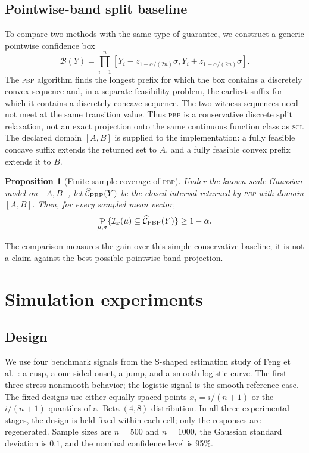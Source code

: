 \documentclass{interact}
\newtheorem{proposition}[theorem]{Proposition}
\theoremstyle{definition}
\theoremstyle{remark}
\newcommand{\I}{\mathcal{I}}
\newcommand{\Ph}{\mathop{\rm P}}
\newcommand{\SCI}{\textnormal{\textsc{sci}}\xspace}
\newcommand{\PBP}{\textnormal{\textsc{pbp}}\xspace}
\begin{document}
\subsection{Pointwise-band split baseline}

To compare two methods with the same type of guarantee, we construct a generic
pointwise confidence box
\[
  \mathcal B(Y)=\prod_{i=1}^n
  [Y_i-z_{1-\alpha/(2n)}\sigma,
   Y_i+z_{1-\alpha/(2n)}\sigma].
\]
The \PBP algorithm finds the longest prefix for which the box contains a
discretely convex sequence and, in a separate feasibility problem, the earliest
suffix for which it contains a discretely concave sequence.  The two witness
sequences need not meet at the same transition value.  Thus \PBP is a
conservative discrete split relaxation, not an exact projection onto the same
continuous function class as \SCI.  The declared domain $[A,B]$ is supplied to
the implementation: a fully feasible concave suffix extends the returned set to
$A$, and a fully feasible convex prefix extends it to $B$.

\begin{proposition}[Finite-sample coverage of \PBP]
\label{prop:pbp}
Under the known-scale Gaussian model on $[A,B]$, let
$\widehat{\mathcal C}_{\rm PBP}(Y)$ be the closed interval returned by \PBP
with domain $[A,B]$.  Then, for every sampled mean vector,
\[
 \Ph_{\mu,\sigma}\{\I_x(\mu)\subseteq
 \widehat{\mathcal C}_{\rm PBP}(Y)\}\geq1-\alpha.
\]
\end{proposition}

The comparison measures
the gain over this simple conservative baseline; it is not a claim against the
best possible pointwise-band projection.

\section{Simulation experiments}
\label{sec:experiments}

\subsection{Design}

We use four benchmark signals from the S-shaped estimation study of
Feng et al.~\citep{feng2022sshaped}: a cusp, a one-sided onset, a jump, and a smooth logistic
curve.  The first three stress nonsmooth behavior; the logistic signal is the
smooth reference case.  The fixed designs use either equally spaced points
$x_i=i/(n+1)$ or the $i/(n+1)$ quantiles of a $\operatorname{Beta}(4,8)$
distribution.  In all three experimental stages, the design is held fixed
within each cell; only the responses are regenerated.  Sample sizes are $n=500$ and
$n=1000$, the Gaussian standard deviation is $0.1$, and the nominal confidence
level is 95\%.
\end{document}
